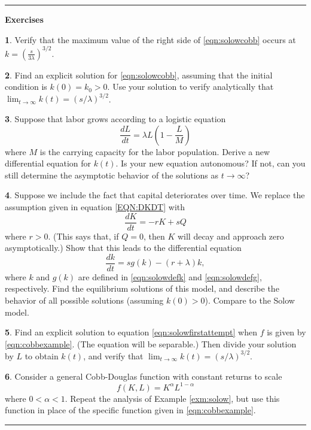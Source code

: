 \documentclass[reqno]{immbook}
\numberwithin{equation}{chapter}
\numberwithin{question}{section}
\numberwithin{theorem}{chapter}
\numberwithin{figure}{chapter}
\theoremstyle{definition}
\newtheorem{exercise}{}[section]
\newenvironment{exercises}%
{%
\medskip\hrule\medskip\noindent\textbf{Exercises}%
}%
{%
\medskip\hrule
}
\begin{document}
%
\begin{exercises}
\begin{exercise}
Verify that the maximum value of the right side
of \eqref{eqn:solowcobb} occurs
at $k=\left(\frac{s}{3\lambda}\right)^{3/2}$.
\end{exercise}
\begin{exercise}
Find an explicit solution for \eqref{eqn:solowcobb},
assuming that the initial condition is $k(0)=k_0 > 0$.
Use your solution to verify analytically that
$\lim_{t\rightarrow\infty} k(t) = \left(s/\lambda\right)^{3/2}$.
\end{exercise}
\begin{exercise}
Suppose that labor grows according to a logistic equation
\begin{equation}
  \frac{dL}{dt} = \lambda L \left(1-\frac{L}{M}\right)
\end{equation}
where $M$ is the carrying capacity for the labor population.
Derive a new differential equation for $k(t)$.
Is your new equation autonomous?
If not, can you still determine the asymptotic
behavior of the solutions as $t\rightarrow\infty$?
\end{exercise}
\begin{exercise}
Suppose we include the fact that capital deteriorates
over time.  We replace the assumption given
in equation \eqref{EQN:DKDT} with
\begin{equation}
   \frac{dK}{dt} = -rK + sQ
\end{equation}
where $r > 0$.
(This says that, if $Q=0$, then $K$ will decay and
approach zero asymptotically.)
Show that this leads to the differential equation
\begin{equation}
   \frac{dk}{dt} = s g(k) - (r+\lambda) k,
\end{equation}
where $k$ and $g(k)$ are defined
in \eqref{eqn:solowdefk} and \eqref{eqn:solowdefg}, 
respectively.
Find the equilibrium solutions of this model, 
and describe the behavior of all possible solutions
(assuming $k(0)>0$).
Compare to the Solow model.
\end{exercise}
\begin{exercise}
Find an explicit solution to equation
\eqref{eqn:solowfirstattempt} when $f$ is given by
\eqref{eqn:cobbexample}.  (The equation will be separable.)
Then divide your solution by $L$ to obtain $k(t)$,
and verify that $\lim_{t\rightarrow\infty} k(t) =
\left(s/\lambda\right)^{3/2}$.
\end{exercise}
\begin{exercise}
Consider a general Cobb-Douglas function with
constant returns to scale
\begin{equation}
   f(K,L) = K^{\alpha}L^{1-\alpha}
\end{equation}
where $0 < \alpha < 1$.
Repeat the analysis of Example \ref{exm:solow},
but use this function in place of the
specific function given in \eqref{eqn:cobbexample}.
\end{exercise}
\end{exercises}
\newpage
%
\end{document}
